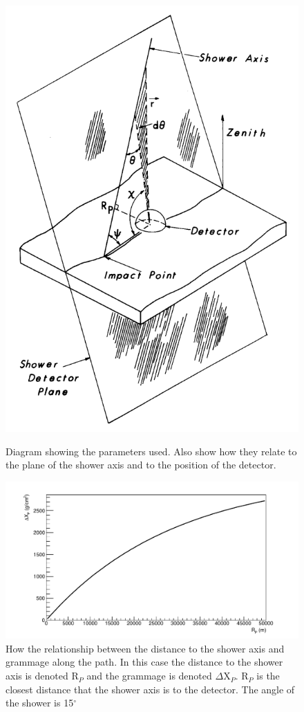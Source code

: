 \begin{figure}
\centering
\includegraphics[height=0.45\textheight]{chapters/pix/SelEff/ShowerPlane_and_Detector.png}
\caption{Diagram showing the parameters used. Also show how they relate to the plane of the shower axis and to the position of the detector.} \label{fig:ShowerPlaneAndAxis}
\vspace{3mm}
\includegraphics[width=\textwidth]{chapters/graphs/SelectionEff/XpVsRp.pdf}
\caption{How the relationship between the distance to the shower axis and grammage along the path. In this case the distance to the shower axis is denoted R$_P$ and the grammage is denoted $\Delta$X$_P$. R$_P$ is the closest distance that the shower axis is to the detector. The angle of the shower is 15$^{\circ}$} \label{fig:XpVsRp}
\end{figure}


